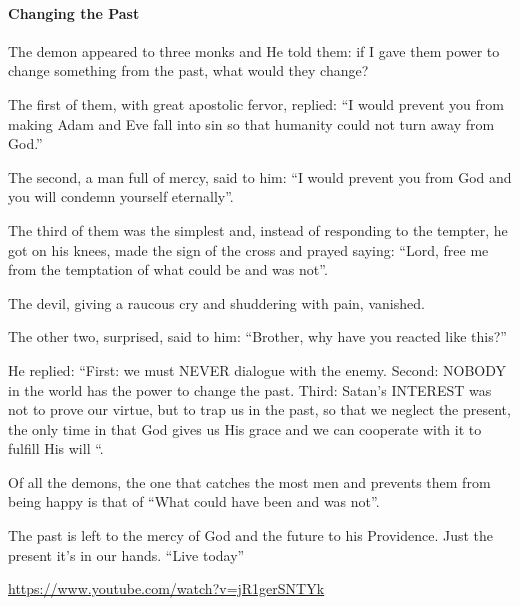 \paragraph{Changing the Past}


The demon appeared to three monks and He told them: if I gave them power to change something from the past, what would they change?

The first of them, with great apostolic fervor, replied: ``I would prevent you from making Adam and Eve fall into sin so that humanity could not turn away from God.''

The second, a man full of mercy, said to him: ``I would prevent you from God and you will condemn yourself eternally''.

The third of them was the simplest and, instead of responding to the tempter, he got on his knees, made the sign of the cross and prayed saying: ``Lord, free me from the temptation of what could be and was not''.

The devil, giving a raucous cry and shuddering with pain, vanished.

The other two, surprised, said to him: ``Brother, why have you reacted like this?''

He replied: ``First: we must NEVER dialogue with the enemy. Second: NOBODY in the world has the power to change the past. Third: Satan's INTEREST was not to prove our virtue, but to trap us in the past, so that we neglect the present, the only time in that God gives us His grace and we can cooperate with it to fulfill His will ``.

Of all the demons, the one that catches the most men and prevents them from being happy is that of ``What could have been and was not''.

The past is left to the mercy of God and the future to his Providence. Just the present it's in our hands. ``Live today''

\url{https://www.youtube.com/watch?v=jR1gerSNTYk}


